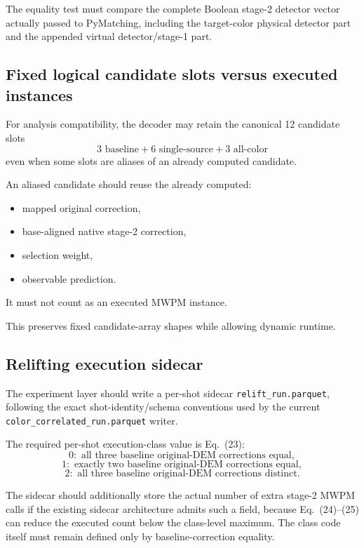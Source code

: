\documentclass[11pt]{article}
\begin{document}
The equality test must compare the complete Boolean stage-2 detector vector
actually passed to PyMatching, including the target-color physical detector
part and the appended virtual detector/stage-1 part.

\subsection{Fixed logical candidate slots versus executed instances}

For analysis compatibility, the decoder may retain the canonical 12 candidate
slots
\[
    3\text{ baseline}
    +6\text{ single-source}
    +3\text{ all-color}
\]
even when some slots are aliases of an already computed candidate.

An aliased candidate should reuse the already computed:
\begin{itemize}
    \item mapped original correction,
    \item base-aligned native stage-2 correction,
    \item selection weight,
    \item observable prediction.
\end{itemize}

It must not count as an executed MWPM instance.

This preserves fixed candidate-array shapes while allowing dynamic runtime.

\subsection{Relifting execution sidecar}

The experiment layer should write a per-shot sidecar
\texttt{relift\_run.parquet}, following the exact shot-identity/schema
conventions used by the current \texttt{color\_correlated\_run.parquet} writer.

The required per-shot execution-class value is Eq.~(23):
\[
    0:\text{ all three baseline original-DEM corrections equal},
\]
\[
    1:\text{ exactly two baseline original-DEM corrections equal},
\]
\[
    2:\text{ all three baseline original-DEM corrections distinct}.
\]

The sidecar should additionally store the actual number of extra stage-2 MWPM
calls if the existing sidecar architecture admits such a field, because
Eq.~(24)--(25) can reduce the executed count below the class-level maximum.
The class code itself must remain defined only by baseline-correction equality.
\end{document}

